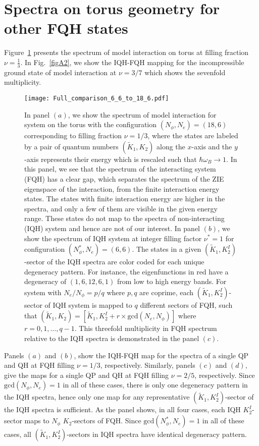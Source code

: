 \documentclass[prb,aps,epsfig,longbibliography,twocolumn]{revtex4-1}
\newcommand{\np}{N_{\phi}}
\begin{document}
\section{Spectra on torus geometry for other FQH states} \label{AdditionalFigures}
Figure~\ref{figA1} presents the spectrum of model interaction on torus at filling fraction $\nu=\frac{1}{3}$. In Fig.~\ref{figA2}, we show the IQH-FQH mapping for the incompressible ground state of model interaction at $\nu=3/7$ which shows the sevenfold multiplicity.

\begin{figure}[h!]
	\texttt{[image: Full\_comparison\_6\_6\_to\_18\_6.pdf]}
	\caption{
	In panel $(a)$, we show the spectrum of model interaction for system on the torus with the configuration $(\np,N_e)=(18,6)$ corresponding to filling fraction $\nu=1/3$, where the states are labeled by a pair of quantum numbers $(\tilde{K}_1,K_2)$ along the $x$-axis and the $y$-axis represents their energy which is rescaled such that $\hbar\omega_B\rightarrow 1$. In this panel, we see that the spectrum of the interacting system (FQH) has a clear gap, which separates the spectrum of the  ZIE eigenspace of the interaction, from the finite interaction energy states. The states with finite interaction energy  are higher in the spectra, and only a few of them are visible in the given energy range. These states do not map to the spectra of non-interacting (IQH) system and hence are not of our interest. In panel $(b)$, we show the spectrum of IQH system at integer filling factor $\nu^{*}=1$ for configuration $(\np^{*},N_e)=(6,6)$. The states in a given $(\tilde{K}_1, {K}^{I}_2)$-sector of the IQH spectra are color coded for each unique degeneracy pattern. For instance, the eigenfunctions in red have a degeneracy of $(1,6,12,6,1)$ from low to high energy bands. For system with $N_e/\np=p/q$ where $p,q$ are coprime, each $(\tilde{K}_1, {K}^{I}_2)$-sector of IQH system is mapped to $q$ different sectors of FQH, such that  $(\tilde{K}_1,K_2)=[\tilde{K}_1,K^I_2+r \times \text{gcd}(N_e,\np)]$ where $r=0,1,\dots,q-1$. This threefold multiplicity in FQH spectrum relative to the IQH spectra is demonstrated in the panel $(c)$.
	}
	\label{figA1}
\end{figure}

Panels $(a)$ and  $(b)$, show the IQH-FQH map for the spectra of a single QP and QH at FQH filling $\nu=1/3$, respectively. Similarly, panels $(c)$ and $(d)
$, give the maps for a single QP and QH at FQH filling $\nu=2/5$, respectively. Since $\text{gcd}(\np,N_e)=1$ in all of these cases, there is only one degeneracy pattern in the IQH spectra, hence only one map for any representative $(\tilde{K}_1,K^I_2)$-sector of the IQH spectra is sufficient. As the panel shows, in all four cases, each IQH $K^I_2$-sector  maps to $\np$ $K_2$-sectors of FQH. Since $\text{gcd}(\np^*,N_e)=1$ in all of these cases, all $(\tilde{K}_1,K^I_2)$-sectors in IQH spectra have identical degeneracy pattern.\cite{ManyBodyTranslationsTorus} 
\end{document}
